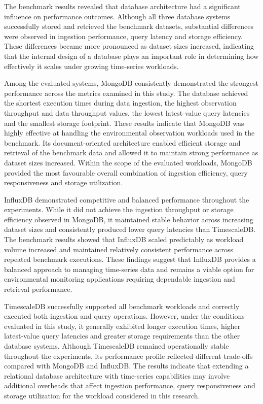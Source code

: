The benchmark results revealed that database architecture had a significant influence on performance outcomes. Although all three database systems successfully stored and retrieved the benchmark datasets, substantial differences were observed in ingestion performance, query latency and storage efficiency. These differences became more pronounced as dataset sizes increased, indicating that the internal design of a database plays an important role in determining how effectively it scales under growing time-series workloads.


Among the evaluated systems, MongoDB consistently demonstrated the strongest performance across the metrics examined in this study. The database achieved the shortest execution times during data ingestion, the highest observation throughput and data throughput values, the lowest latest-value query latencies and the smallest storage footprint. These results indicate that MongoDB was highly effective at handling the environmental observation workloads used in the benchmark. Its document-oriented architecture enabled efficient storage and retrieval of the benchmark data and allowed it to maintain strong performance as dataset sizes increased. Within the scope of the evaluated workloads, MongoDB provided the most favourable overall combination of ingestion efficiency, query responsiveness and storage utilization.

InfluxDB demonstrated competitive and balanced performance throughout the experiments. While it did not achieve the ingestion throughput or storage efficiency observed in MongoDB, it maintained stable behavior across increasing dataset sizes and consistently produced lower query latencies than TimescaleDB. The benchmark results showed that InfluxDB scaled predictably as workload volume increased and maintained relatively consistent performance across repeated benchmark executions. These findings suggest that InfluxDB provides a balanced approach to managing time-series data and remains a viable option for environmental monitoring applications requiring dependable ingestion and retrieval performance.

TimescaleDB successfully supported all benchmark workloads and correctly executed both ingestion and query operations. However, under the conditions evaluated in this study, it generally exhibited longer execution times, higher latest-value query latencies and greater storage requirements than the other database systems. Although TimescaleDB remained operationally stable throughout the experiments, its performance profile reflected different trade-offs compared with MongoDB and InfluxDB. The results indicate that extending a relational database architecture with time-series capabilities may involve additional overheads that affect ingestion performance, query responsiveness and storage utilization for the workload considered in this research.


